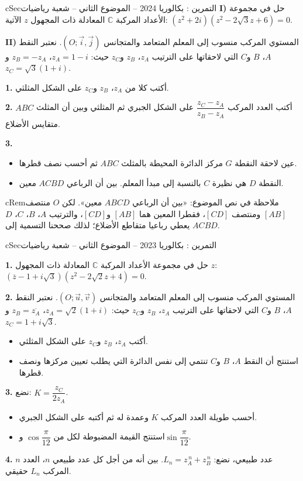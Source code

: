 \documentclass[12pt,a4paper]{article}
\newenvironment{BOX}[2]{\begin{otherlanguage}{english}\begin{arbox}{#1}{#2}}{\end{arbox}\end{otherlanguage}}
\newenvironment{molahada}[1][ملاحظة]{\begin{BOX}{cRem}{#1}}{\end{BOX}}
\newcounter{exo}
\newenvironment{tamrin}[1]{\stepcounter{exo}\begin{BOX}{cSec}{التمرين \theexo: #1}}{\end{BOX}}
\newenvironment{sq}{\begin{itemize}[leftmargin=2.4em,itemsep=3pt]}{\end{itemize}}
\newcommand{\qa}{\item[(أ)]}\newcommand{\qb}{\item[(ب)]}\newcommand{\qc}{\item[(جـ)]}\newcommand{\qd}{\item[(د)]}\newcommand{\qe}{\item[(هـ)]}
\newcommand{\QQ}[1]{\par\smallskip\textbf{#1.} }
\begin{document}
\begin{tamrin}{بكالوريا 2024 -- الموضوع الثاني -- شعبة رياضيات}
\textbf{I)} حل في مجموعة الأعداد المركبة $\mathbb{C}$ المعادلة ذات المجهول $z$ الآتية: $\left(z^2+2i\right)\left(z^2-2\sqrt3z+6\right)=0$.

\textbf{II)} المستوي المركب منسوب إلى المعلم المتعامد والمتجانس $\left(O;\vec i,\vec j\right)$.
نعتبر النقط $A$، $B$ و$C$ التي لاحقاتها على الترتيب $z_A$، $z_B$ و$z_C$ حيث: $z_A=1-i$، $z_B=-z_A$ و$z_C=\sqrt3(1+i)$.

\QQ{1} أكتب كلا من $z_A$، $z_B$ و$z_C$ على الشكل المثلثي.

\QQ{2} أكتب العدد المركب $\dfrac{z_C-z_A}{z_B-z_A}$ على الشكل الجبري ثم المثلثي وبين أن المثلث $ABC$ متقايس الأضلاع.

\QQ{3}
\begin{sq}
\qa عين لاحقة النقطة $G$ مركز الدائرة المحيطة بالمثلث $ABC$ ثم أحسب نصف قطرها.
\qb النقطة $D$ هي نظيرة $C$ بالنسبة إلى مبدأ المعلم. بين أن الرباعي $ACBD$ معين.
\end{sq}
\end{tamrin}
\begin{molahada}
في نص الموضوع: «بين أن الرباعي $ABCD$ معين». لكن $O$ منتصف $[AB]$ ومنتصف $[CD]$، فقطرا المعين هما $[AB]$ و$[CD]$، والترتيب $A$، $B$، $C$، $D$ يعطي رباعيا متقاطع الأضلاع؛ لذلك صححنا التسمية إلى $ACBD$.
\end{molahada}

\begin{tamrin}{بكالوريا 2023 -- الموضوع الثاني -- شعبة رياضيات}
\QQ{1} حل في مجموعة الأعداد المركبة $\mathbb{C}$ المعادلة ذات المجهول $z$: $\left(\overline{z}-1+i\sqrt3\right)\left(z^2-2\sqrt2z+4\right)=0$.

\QQ{2} المستوي المركب منسوب إلى المعلم المتعامد والمتجانس $\left(O;\vec u,\vec v\right)$.
نعتبر النقط $A$، $B$ و$C$ التي لاحقاتها على الترتيب $z_A$، $z_B$ و$z_C$ حيث: $z_A=\sqrt2(1+i)$، $z_B=\overline{z_A}$ و$z_C=1+i\sqrt3$.
\begin{sq}
\qa أكتب $z_A$، $z_B$ و$z_C$ على الشكل المثلثي.
\qb استنتج أن النقط $A$، $B$ و$C$ تنتمي إلى نفس الدائرة التي يطلب تعيين مركزها ونصف قطرها.
\end{sq}
\QQ{3} نضع: $K=\dfrac{z_C}{2z_A}$.
\begin{sq}
\qa أحسب طويلة العدد المركب $K$ وعمدة له ثم أكتبه على الشكل الجبري.
\qb استنتج القيمة المضبوطة لكل من $\cos\dfrac{\pi}{12}$ و$\sin\dfrac{\pi}{12}$.
\end{sq}
\QQ{4} $n$ عدد طبيعي، نضع: $L_n=z_A^{\,n}+z_B^{\,n}$. بين أنه من أجل كل عدد طبيعي $n$، العدد المركب $L_n$ حقيقي.
\end{tamrin}
\end{document}
